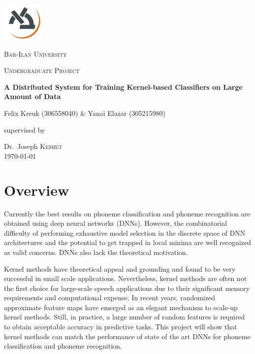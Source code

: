 \documentclass[12pt,a4paper]{article}
\begin{document}
\begin{titlepage}
	\centering
	\includegraphics[width=0.15\textwidth]{biu_logo.png}\par\vspace{1cm}
	{\scshape\LARGE Bar-Ilan University \par}
	\vspace{1cm}
	{\scshape\Large Undergraduate Project\par}
	\vspace{1cm}
	{\huge\bfseries A Distributed System for Training Kernel-based Classifiers on Large Amount of Data\par}
	\vspace{1cm}
	{\Large Felix Kreuk (306558040) \& Yanai Elazar (305215980)\par}
	\vspace{1cm}
	supervised by\par
	Dr.~Joseph \textsc{Keshet}\\
	\vspace{5cm}
{\large \today}
\end{titlepage}

\tableofcontents
\newpage

\section{Overview}
Currently the best results on phoneme classification and phoneme recognition are obtained using deep neural networks (DNNs). However, the combinatorial difficulty of performing exhaustive model selection in the discrete space of DNN architectures and the potential to get trapped in local minima are well recognized as valid concerns. DNNs also lack the theoretical motivation.

Kernel methods have theoretical appeal and grounding and found to be very successful in small scale applications. Nevertheless, kernel methods are often not the first choice for large-scale speech applications due to their significant memory requirements and computational expense. In recent years, randomized approximate feature maps have emerged as an elegant mechanism to scale-up kernel methods. Still, in practice, a large number of random features is required to obtain acceptable accuracy in predictive tasks. This project will show that kernel methods can match the performance of state of the art DNNs for phoneme classification and phoneme recognition. 
\end{document}
